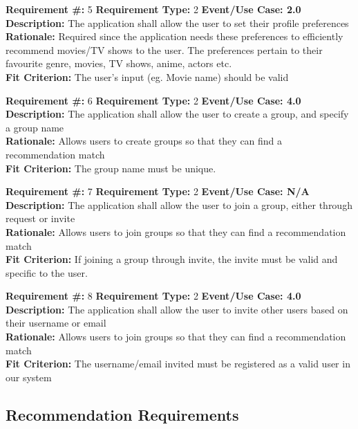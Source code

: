 \documentclass[12pt]{article}
\begin{document}
\bigskip
\textbf{Requirement \#:} 5 \quad \textbf{Requirement Type:} 2 \quad \textbf{Event/Use Case: 2.0}
\medskip
\\\textbf{Description:} The application shall allow the user to set their profile preferences 
\\\textbf{Rationale:} Required since the application needs these preferences to efficiently recommend movies/TV shows to the user. The preferences pertain to their favourite genre, movies, TV shows, anime, actors etc.
\\\textbf{Fit Criterion:} The user's input (eg. Movie name) should be valid

\bigskip
\textbf{Requirement \#:} 6 \quad \textbf{Requirement Type:} 2 \quad \textbf{Event/Use Case: 4.0}
\medskip
\\\textbf{Description:} The application shall allow the user to create a group, and specify a group name
\\\textbf{Rationale:} Allows users to create groups so that they can find a recommendation match
\\\textbf{Fit Criterion:} The group name must be unique.

\bigskip
\textbf{Requirement \#:} 7 \quad \textbf{Requirement Type:} 2 \quad \textbf{Event/Use Case: N/A}
\medskip
\\\textbf{Description:} The application shall allow the user to join a group, either through request or invite
\\\textbf{Rationale:} Allows users to join groups so that they can find a recommendation match
\\\textbf{Fit Criterion:} If joining a group through invite, the invite must be valid and specific to the user.

\bigskip
\textbf{Requirement \#:} 8 \quad \textbf{Requirement Type:} 2 \quad \textbf{Event/Use Case: 4.0}
\medskip
\\\textbf{Description:} The application shall allow the user to invite other users based on their username or email
\\\textbf{Rationale:} Allows users to join groups so that they can find a recommendation match
\\\textbf{Fit Criterion:} The username/email invited must be registered as a valid user in our system 

\subsection{Recommendation Requirements} 
\noindent
\end{document}
